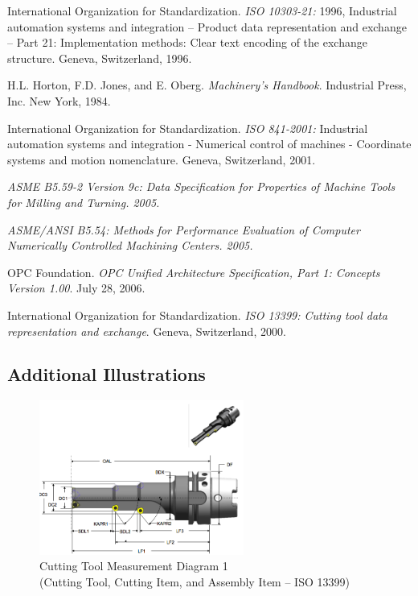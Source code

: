 International Organization for Standardization. \textit{ISO 10303-21:} 1996, Industrial automation systems and integration -- Product data representation and exchange -- Part 21: Implementation methods: Clear text encoding of the exchange structure. Geneva, Switzerland, 1996.

H.L. Horton, F.D. Jones, and E. Oberg. \textit{Machinery's Handbook}. Industrial Press, Inc. New York, 1984.

International Organization for Standardization. \textit{ISO 841-2001:} Industrial automation systems and integration - Numerical control of machines - Coordinate systems and motion nomenclature. Geneva, Switzerland, 2001.

\textit{ASME B5.59-2 Version 9c: Data Specification for Properties of Machine Tools for Milling and Turning. 2005.}

\textit{ASME/ANSI B5.54: Methods for Performance Evaluation of Computer Numerically Controlled Machining Centers. 2005.}

OPC Foundation. \textit{OPC Unified Architecture Specification, Part 1: Concepts Version 1.00}. July 28, 2006.

International Organization for Standardization. \textit{ISO 13399:  Cutting tool data representation and exchange}. Geneva, Switzerland, 2000.

\pagebreak

\subsection{Additional Illustrations}

\begin{figure}[ht]
  \centering
  \includegraphics[width=0.6\textwidth]{figures/a1-cutting-tool-measurement-diagram-3.png}
  \caption{Cutting Tool Measurement Diagram 1
  \\ (Cutting Tool, Cutting Item, and Assembly Item – ISO 13399)}
  \label{fig:a1-cutting-tool-measurement-diagram-3}
\end{figure}
\FloatBarrier

